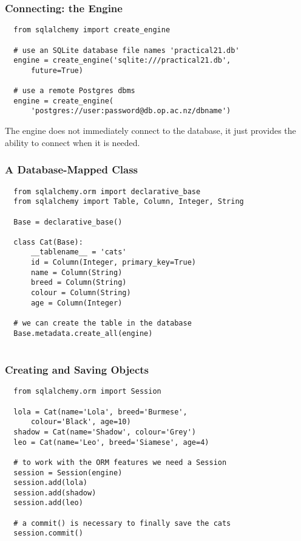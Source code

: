 \documentclass[10pt]{beamer}
\begin{document}
\begin{frame}[fragile]
  \frametitle{Connecting: the Engine}
  
  \begin{verbatim}
  from sqlalchemy import create_engine
  
  # use an SQLite database file names 'practical21.db'
  engine = create_engine('sqlite:///practical21.db', 
      future=True)
  
  # use a remote Postgres dbms
  engine = create_engine(
      'postgres://user:password@db.op.ac.nz/dbname')                                                                                                           
 \end{verbatim} 
 
 \vspace{5mm}
 The engine does not immediately connect to the database, it just provides the
 ability to connect when it is needed.
   
\end{frame}

\begin{frame}[fragile]
  \frametitle{A Database-Mapped Class}
  
  \begin{verbatim}
  from sqlalchemy.orm import declarative_base
  from sqlalchemy import Table, Column, Integer, String
  
  Base = declarative_base()
  
  class Cat(Base):
      __tablename__ = 'cats'
      id = Column(Integer, primary_key=True)
      name = Column(String)
      breed = Column(String)
      colour = Column(String)
      age = Column(Integer)
      
  # we can create the table in the database
  Base.metadata.create_all(engine)
      
  \end{verbatim}
    
  \end{frame}
  
\begin{frame}[fragile]
  \frametitle{Creating and Saving Objects}
  
  \begin{verbatim}
  from sqlalchemy.orm import Session
    
  lola = Cat(name='Lola', breed='Burmese', 
      colour='Black', age=10)
  shadow = Cat(name='Shadow', colour='Grey')
  leo = Cat(name='Leo', breed='Siamese', age=4)
  
  # to work with the ORM features we need a Session
  session = Session(engine)
  session.add(lola)
  session.add(shadow)
  session.add(leo)
  
  # a commit() is necessary to finally save the cats
  session.commit()
        
  \end{verbatim}
    
  \end{frame}
  
\end{document}
